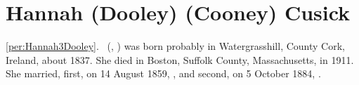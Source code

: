 \section{Hannah (Dooley) (Cooney) Cusick}

\ref{per:Hannah3Dooley}.\  (, ) was born probably in Watergrasshill, County Cork, Ireland, about 1837.\cite{Census1855Hannah3Dooley} She died in Boston, Suffolk County, Massachusetts, in 1911.\cite{Hannah3DooleyDeath} She married, first, on 14 August 1859, ,\cite{JeremiahCooneyMarriage} and second, on 5 October 1884, .\cite{MichaelCusickMarriage}